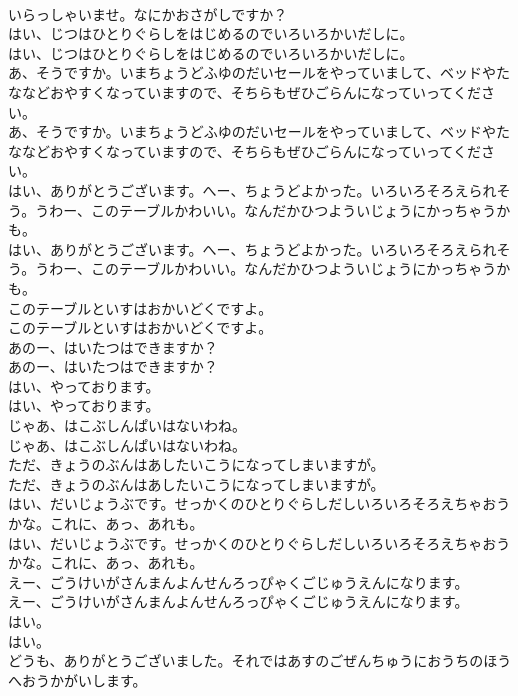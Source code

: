 \documentclass[8pt]{extreport}
\begin{document}
\begin{CJK}{UTF8}{min}
\\	いらっしゃいませ。なにかおさがしですか？
\\	はい、じつはひとりぐらしをはじめるのでいろいろかいだしに。
\\	はい、じつはひとりぐらしをはじめるのでいろいろかいだしに。
\\	あ、そうですか。いまちょうどふゆのだいセールをやっていまして、ベッドやたななどおやすくなっていますので、そちらもぜひごらんになっていってください。
\\	あ、そうですか。いまちょうどふゆのだいセールをやっていまして、ベッドやたななどおやすくなっていますので、そちらもぜひごらんになっていってください。
\\	はい、ありがとうございます。へー、ちょうどよかった。いろいろそろえられそう。うわー、このテーブルかわいい。なんだかひつよういじょうにかっちゃうかも。　　
\\	はい、ありがとうございます。へー、ちょうどよかった。いろいろそろえられそう。うわー、このテーブルかわいい。なんだかひつよういじょうにかっちゃうかも。　　
\\	このテーブルといすはおかいどくですよ。
\\	このテーブルといすはおかいどくですよ。
\\	あのー、はいたつはできますか？
\\	あのー、はいたつはできますか？
\\	はい、やっております。
\\	はい、やっております。
\\	じゃあ、はこぶしんぱいはないわね。
\\	じゃあ、はこぶしんぱいはないわね。
\\	ただ、きょうのぶんはあしたいこうになってしまいますが。
\\	ただ、きょうのぶんはあしたいこうになってしまいますが。
\\	はい、だいじょうぶです。せっかくのひとりぐらしだしいろいろそろえちゃおうかな。これに、あっ、あれも。
\\	はい、だいじょうぶです。せっかくのひとりぐらしだしいろいろそろえちゃおうかな。これに、あっ、あれも。
\\	えー、ごうけいがさんまんよんせんろっぴゃくごじゅうえんになります。
\\	えー、ごうけいがさんまんよんせんろっぴゃくごじゅうえんになります。
\\	はい。
\\	はい。
\\	どうも、ありがとうございました。それではあすのごぜんちゅうにおうちのほうへおうかがいします。

\end{CJK}
\end{document}
